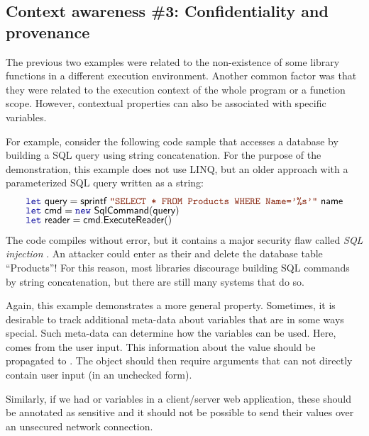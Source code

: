 
\subsection{Context awareness \#3: Confidentiality and provenance}

The previous two examples were related to the non-existence of some library functions in a different
execution environment. Another common factor was that they were related to the execution context of 
the whole program or a function scope. However, contextual properties can also be associated with
specific variables.

For example, consider the following code sample that accesses a database by building a SQL query
using string concatenation. For the purpose of the demonstration, this example does not use LINQ, 
but an older approach with a parameterized SQL query written as a string:
%
\begin{equation*}
\begin{array}{l}
\kvd{let}~\ident{query} = \ident{sprintf}~\str{SELECT * FROM Products WHERE Name='\%s'}~\ident{name}\\[-0.25em]
\kvd{let}~\ident{cmd} = \kvd{new}~\ident{SqlCommand}(\ident{query})\\[-0.25em]
\kvd{let}~\ident{reader} = \ident{cmd.ExecuteReader}()
\end{array}
\end{equation*}
%
The code compiles without error, but it contains a major security flaw called \emph{SQL injection}
\cite{app-sql-injection}. An attacker could enter  as their 
 and delete the database table ``Products''! For this reason, most libraries discourage 
building SQL commands by string concatenation, but there are still many systems that do so.

Again, this example demonstrates a more general property. Sometimes, it is desirable to track additional
meta-data about variables that are in some ways special. Such meta-data can determine how the variables
can be used. Here,  comes from the user input. This information about the value should
be propagated to . The  object should then require arguments that can
not directly contain user input (in an unchecked form). 

Similarly, if we had  or  variables in a client/server web application,
these should be annotated as sensitive and it should not be possible to send their values over an
unsecured network connection.

